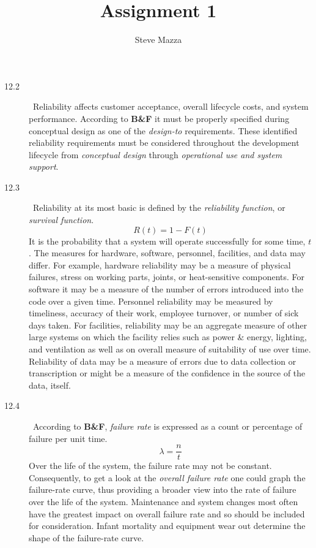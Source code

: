\documentclass[letterpaper,10pt]{article}
\title{Assignment 1}
\author{Steve Mazza}
\begin{document}
\maketitle

\begin{description}
\item[12.2]\ 
Reliability affects customer acceptance, overall lifecycle costs, and system performance.  According to \textbf{B\&F} it must be properly specified during conceptual design as one of the \emph{design-to} requirements.  These identified reliability requirements must be considered throughout the development lifecycle from \emph{conceptual design} through \emph{operational use and system support}.

\item[12.3]\ 
Reliability at its most basic is defined by the \emph{reliability function}, or \emph{survival function}.\[R(t) = 1-F(t)\]It is the probability that a system will operate successfully for some time, $t$.  The measures for hardware, software, personnel, facilities, and data may differ.  For example, hardware reliability may be a measure of physical failures, stress on working parts, joints, or heat-sensitive components.  For software it may be a measure of the number of errors introduced into the code over a given time.  Personnel reliability may be measured by timeliness, accuracy of their work, employee turnover, or number of sick days taken.  For facilities, reliability may be an aggregate measure of other large systems on which the facility relies such as power \& energy, lighting, and ventilation as well as on overall measure of suitability of use over time.  Reliability of data may be  a measure of errors due to data collection or transcription or might be a measure of the confidence in the source of the data, itself.

\item[12.4]\ 
According to \textbf{B\&F}, \emph{failure rate} is expressed as a count or percentage of failure per unit time.  \[\lambda = \frac{n}{t}\]Over the life of the system, the failure rate may not be constant.  Consequently, to get a look at the \emph{overall failure rate} one could graph the failure-rate curve, thus providing a broader view into the rate of failure over the life of the system.  Maintenance and system changes most often have the greatest impact on overall failure rate and so should be included for consideration.  Infant mortality and equipment wear out determine the shape of the failure-rate curve.


\end{description}
\end{document}
